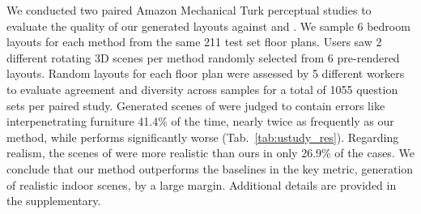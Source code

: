 \documentclass{article}
\newcommand{\tabref}[1]{Tab.~\ref{#1}}
\begin{document}
We conducted two paired Amazon Mechanical Turk perceptual studies to evaluate
the quality of our generated layouts against \cite{Ritchie2019CVPR} and
\cite{Wang2020ARXIV}. We sample 6 bedroom layouts for each method from the
same 211 test set floor plans. Users saw 2 different rotating 3D scenes per
method randomly selected from 6 pre-rendered layouts. Random layouts for each
floor plan were assessed by 5 different workers to evaluate agreement and
diversity across samples for a total of 1055 question sets per paired study.
Generated scenes of \cite{Ritchie2019CVPR} were judged to contain errors like
interpenetrating furniture 41.4\% of the time, nearly twice as frequently as
our method, while \cite{Wang2020ARXIV} performs significantly worse
(\tabref{tab:ustudy_res}). Regarding realism, the scenes of
\cite{Ritchie2019CVPR} were more realistic than ours in only 26.9\% of the
cases. We conclude that our method outperforms the baselines in
the key metric, generation of realistic indoor scenes, by a large margin.
Additional details are provided in the supplementary.
\begin{table}[h!]
    \centering
    \label{tab:ustudy_res}
    \vspace{-0.8em}
\end{table}
\end{document}

